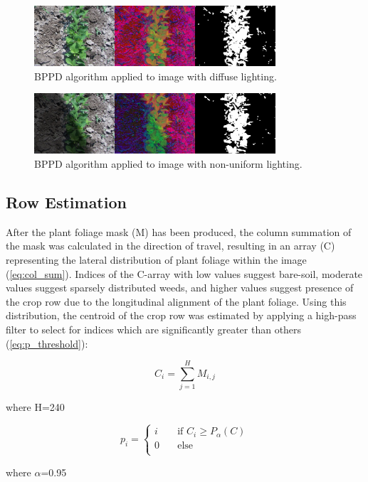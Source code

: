 \documentclass[authoryear]{elsarticle}
\begin{document}
\begin{figure}
  \centering
  \includegraphics[width=0.8\textwidth,natwidth=610,natheight=642]{bppd_normal.jpg}
  \caption{BPPD algorithm applied to image with diffuse lighting.}
  \label{fig:bppd_normal}
\end{figure}

\begin{figure}
  \centering
  \includegraphics[width=0.8\textwidth,natwidth=610,natheight=642]{bppd_shadow.jpg}
  \caption{BPPD algorithm applied to image with non-uniform lighting.}
  \label{fig:bppd_shadow}
\end{figure}

\subsection{Row Estimation}
After the plant foliage mask (M) has been produced, the column
summation of the mask was calculated in the direction of travel,
resulting in an array (C) representing the lateral distribution of
plant foliage within the image (\ref{eq:col_sum}). Indices of the
C-array with low values suggest bare-soil, moderate values suggest
sparsely distributed weeds, and higher values suggest presence of the
crop row due to the longitudinal alignment of the plant foliage. Using
this distribution, the centroid of the crop row was estimated by
applying a high-pass filter to select for indices which are
significantly greater than others (\ref{eq:p_threshold}):

\begin{equation}
  C_{i} = \displaystyle\sum_{j=1}^{H} M_{i,j}
  \label{eq:col_sum}
\end{equation}
\begin{flushleft}
where H=240
\end{flushleft}

\begin{equation}
  p_{i} =
  \begin{cases}
    i & \quad \text{if } C_{i} \geq P_{\alpha}(C) \\
    0 & \quad \text{else} \\
  \end{cases}
  \label{eq:p_threshold}
\end{equation}
\begin{flushleft}
where $\alpha$=0.95
\end{flushleft}
\end{document}
